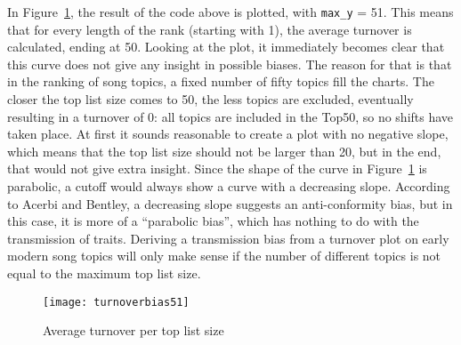 In Figure~\ref{fig:turnoverbias51}, the result of the code above is plotted, with \texttt{max\_y} = 51. This means that for every length of the rank (starting with 1), the average turnover is calculated, ending at 50. Looking at the plot, it immediately becomes clear that this curve does not give any insight in possible biases. The reason for that is that in the ranking of song topics, a fixed number of fifty topics fill the charts. The closer the top list size comes to 50, the less topics are excluded, eventually resulting in a turnover of 0: all topics are included in the Top50, so no shifts have taken place. At first it sounds reasonable to create a plot with no negative slope, which means that the top list size should not be larger than 20, but in the end, that would not give extra insight. Since the shape of the curve in Figure~\ref{fig:turnoverbias51} is parabolic, a cutoff would always show a curve with a decreasing slope. According to Acerbi and Bentley, a decreasing slope suggests an anti-conformity bias, but in this case, it is more of a \enquote{parabolic bias}, which has nothing to do with the transmission of traits. Deriving a transmission bias from a turnover plot on early modern song topics will only make sense if the number of different topics is not equal to the maximum top list size.

\begin{figure}[hbt!]
	\centering
	\texttt{[image: turnoverbias51]}
	\caption{Average turnover per top list size}
	\label{fig:turnoverbias51}
\end{figure}


